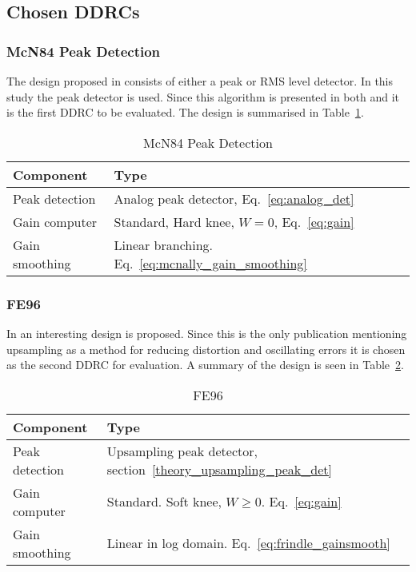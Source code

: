 \documentclass[../main2.tex]{subfiles}
\begin{document}
\subsection{Chosen DDRCs} \label{method_chosen_DDRC}
\subsubsection{McN84 Peak Detection}
The design proposed in \cite{mcnally1984dynamic} consists of either a peak or RMS level detector. In this study the peak detector is used. Since this algorithm is presented in both \cite{zolzer2008digital} and \cite{dafx11} it is the first DDRC to be evaluated.  The design is summarised in Table~\ref{tab:mcn84}.
\begin{table}[h]
\begin{center}
\caption{McN84 Peak Detection}
\label{tab:mcn84}
\begin{tabular}{| l | l |}
	\hline
	Component & Type \\ \hline
	Peak detection & Analog peak detector, Eq.~\eqref{eq:analog_det} \\
	Gain computer & Standard, Hard knee, $W=0$, Eq.~\eqref{eq:gain} \\
	Gain smoothing & Linear branching. Eq.~\eqref{eq:mcnally_gain_smoothing} \\
	\hline
\end{tabular}
\end{center}
\end{table}
\subsubsection{FE96}
In \cite{frindl1996dynamic} an interesting design is proposed. Since this is the only publication mentioning upsampling as a method for reducing distortion and oscillating errors it is chosen as the second DDRC for evaluation. A summary of the design is seen in Table~\ref{tab:fe96}.
\begin{table}[h]
\begin{center}
\caption{FE96}
\label{tab:fe96}
\begin{tabular}{| l | l |}
	\hline
	Component & Type \\ \hline
	Peak detection & Upsampling peak detector, section~\ref{theory_upsampling_peak_det} \\
	Gain computer & Standard. Soft knee, $W\geq0$. Eq.~\eqref{eq:gain} \\
	Gain smoothing & Linear in log domain. Eq.~\eqref{eq:frindle_gainsmooth} \\
	\hline
\end{tabular}
\end{center}
\end{table}
\end{document}
